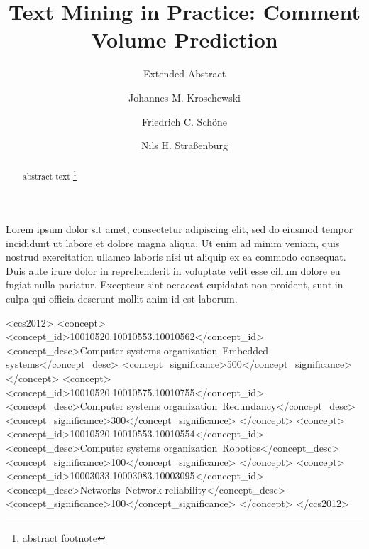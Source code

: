 \documentclass[10pt,sigconf]{acmart}
\begin{document}
\title{Text Mining in Practice: Comment Volume Prediction}
\subtitle{Extended Abstract} %

\author{Johannes M. Kroschewski}

\author{Friedrich C. Schöne}

\author{Nils H. Straßenburg}

\renewcommand{\shortauthors}{M. Kroschewski et al.}


\begin{abstract}
	abstract text \footnote{abstract footnote}
\end{abstract}
Lorem ipsum dolor sit amet, consectetur adipiscing elit, sed do eiusmod tempor incididunt ut labore et dolore magna aliqua. Ut enim ad minim veniam, quis nostrud exercitation ullamco laboris nisi ut aliquip ex ea commodo consequat. Duis aute irure dolor in reprehenderit in voluptate velit esse cillum dolore eu fugiat nulla pariatur. Excepteur sint occaecat cupidatat non proident, sunt in culpa qui officia deserunt mollit anim id est laborum.
%
%
\begin{CCSXML}
<ccs2012>
 <concept>
  <concept_id>10010520.10010553.10010562</concept_id>
  <concept_desc>Computer systems organization~Embedded systems</concept_desc>
  <concept_significance>500</concept_significance>
 </concept>
 <concept>
  <concept_id>10010520.10010575.10010755</concept_id>
  <concept_desc>Computer systems organization~Redundancy</concept_desc>
  <concept_significance>300</concept_significance>
 </concept>
 <concept>
  <concept_id>10010520.10010553.10010554</concept_id>
  <concept_desc>Computer systems organization~Robotics</concept_desc>
  <concept_significance>100</concept_significance>
 </concept>
 <concept>
  <concept_id>10003033.10003083.10003095</concept_id>
  <concept_desc>Networks~Network reliability</concept_desc>
  <concept_significance>100</concept_significance>
 </concept>
</ccs2012>  
\end{CCSXML}
\end{document}

